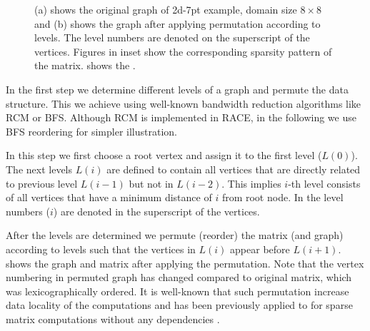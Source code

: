 \begin{figure}[tb]
{\begin{picture}
		\end{picture}
	}
	\caption{\label{fig:level_construction}(a) shows the original graph of 2d-7pt example, domain size $8 \times 8$  and (b) shows the graph after applying permutation according to levels. The level numbers are denoted on the superscript of the vertices. Figures in inset show the corresponding sparsity pattern of the matrix.  shows the \levelPtr.}
\end{figure}
In the first step we determine different levels of a graph and permute the data structure.
This we achieve using well-known bandwidth reduction algorithms like \Acrfull{RCM}\cite{RCM}
 or \Acrfull{BFS}\cite{BFS}. Although \acrshort{RCM} is implemented in \acrshort{RACE},
 in the following we use \acrshort{BFS} reordering for simpler illustration. 
 
In this step we first choose a root vertex and assign it to the first level ($L(0)$). 
The next levels $L(i)$ are defined to contain all vertices that are directly related to previous
level $L(i-1)$ but not in $L(i-2)$. This implies $i$-th level consists of all vertices
that have a minimum distance of $i$ from root node. In  the
level numbers ($i$) are denoted in the superscript of the vertices. 

After the levels are determined we permute (reorder) the matrix (and graph) according
to levels such that the vertices in $L(i)$ appear before $L(i+1)$.  
shows the graph and matrix after applying the permutation. Note that the vertex numbering 
in permuted graph has changed compared to original matrix, which was lexicographically ordered.
It is well-known  that such permutation increase data locality
of the computations and has been previously applied to for sparse matrix
computations without any dependencies \cite{RCM_Sparse_computation}.


